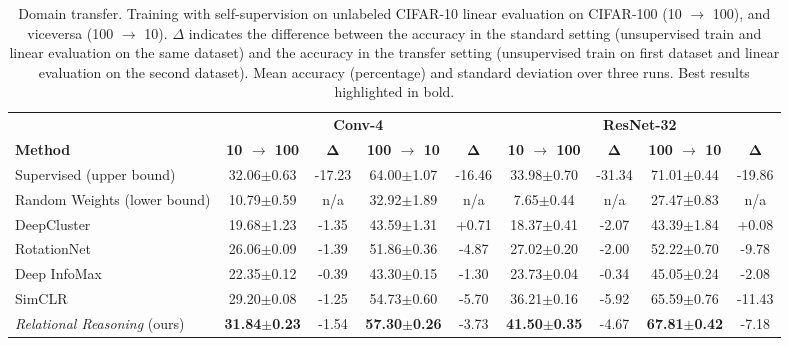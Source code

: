 \documentclass{article}
\begin{document}
\begin{table}[H]
 \caption{Domain transfer. Training with self-supervision on unlabeled CIFAR-10 linear evaluation on CIFAR-100 (10 $\rightarrow$ 100), and viceversa (100 $\rightarrow$ 10). $\Delta$ indicates the difference between the accuracy in the standard setting (unsupervised train and linear evaluation on the same dataset) and the accuracy in the transfer setting (unsupervised train on first dataset and linear evaluation on the second dataset). Mean accuracy (percentage) and standard deviation over three runs. Best results highlighted in bold.}
 \label{tab:transfer_learning}
 \begin{adjustbox}{width=\columnwidth,center}
  \centering
  \begin{tabular}{lcccccccc}
    \toprule
& \multicolumn{4}{c}{\textbf{Conv-4}} & \multicolumn{4}{c}{\textbf{ResNet-32}} \\
    \cmidrule[0.1pt](r){2-5} \cmidrule[0.1pt](l){6-9}
    \textbf{Method} &
    \textbf{10 $\rightarrow$ 100} & $\boldsymbol{\Delta}$ & \textbf{100 $\rightarrow$ 10} & $\boldsymbol{\Delta}$ &
    \textbf{10 $\rightarrow$ 100} & $\boldsymbol{\Delta}$ & \textbf{100 $\rightarrow$ 10} & $\boldsymbol{\Delta}$\\
    \midrule
Supervised (upper bound) & 
    32.06$\pm$\small{0.63} & -17.23 & 64.00$\pm$\small{1.07} & -16.46 &
    33.98$\pm$\small{0.70} & -31.34 & 71.01$\pm$\small{0.44} & -19.86 \\
    Random Weights (lower bound) & 
    10.79$\pm$\small{0.59} & n/a & 32.92$\pm$\small{1.89} & n/a &
    7.65$\pm$\small{0.44} & n/a & 27.47$\pm$\small{0.83} & n/a \\
    \cmidrule(l){1-9}
    DeepCluster \citep{caron2018deep} & 
    19.68$\pm$\small{1.23} & -1.35 & 43.59$\pm$\small{1.31} & +0.71 &
    18.37$\pm$\small{0.41} & -2.07 & 43.39$\pm$\small{1.84} & +0.08 \\
    RotationNet \citep{gidaris2018unsupervised} & 
    26.06$\pm$\small{0.09} & -1.39 & 51.86$\pm$\small{0.36} & -4.87 &
    27.02$\pm$\small{0.20} & -2.00 & 52.22$\pm$\small{0.70} & -9.78 \\
    Deep InfoMax \citep{hjelm2018learning} & 
    22.35$\pm$\small{0.12} & -0.39 & 43.30$\pm$\small{0.15} & -1.30 &
    23.73$\pm$\small{0.04} & -0.34 & 45.05$\pm$\small{0.24} & -2.08 \\
    SimCLR \citep{chen2020simple} &
    29.20$\pm$\small{0.08} & -1.25 & 54.73$\pm$\small{0.60} & -5.70 &
    36.21$\pm$\small{0.16} & -5.92 & 65.59$\pm$\small{0.76} & -11.43 \\
    \emph{Relational Reasoning} (ours) & 
    \textbf{31.84$\pm$\small{0.23}} & -1.54 & \textbf{57.30$\pm$\small{0.26}} & -3.73 &
    \textbf{41.50$\pm$\small{0.35}} & -4.67 & \textbf{67.81$\pm$\small{0.42}} & -7.18 \\
    \bottomrule
  \end{tabular}
 \end{adjustbox}
\end{table}
\end{document}
